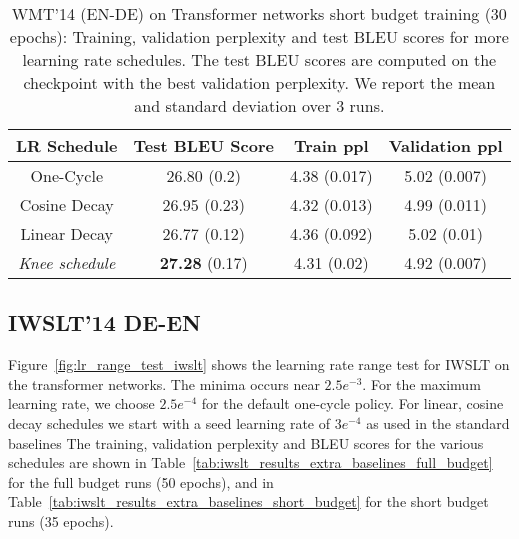 \documentclass[twoside,11pt]{article}
\newcommand{\lrschedule}{\textit{Knee schedule}}
\begin{document}
\begin{table}[!th]
\small
\centering
\caption{WMT'14 (EN-DE) on Transformer networks short budget training (30 epochs): Training, validation perplexity and test BLEU scores for more learning rate schedules. The test BLEU scores are computed on the checkpoint with the best validation perplexity. We report the mean and standard deviation over 3 runs.}
\label{tab:wmt_results_extra_baselines_short_budget}
\begin{tabular}{cccc}
  \toprule
  LR Schedule    & Test BLEU Score  & Train ppl & Validation ppl  \\ 
  \midrule
  One-Cycle      &  26.80 (0.2) & 4.38 (0.017)  & 5.02 (0.007)    \\
  Cosine Decay  &  26.95 (0.23) & 4.32 (0.013)  & 4.99 (0.011)   \\
  Linear Decay  & 26.77  (0.12) & 4.36 (0.092)  & 5.02 (0.01)  \\
  \lrschedule{} & \textbf{27.28} (0.17)  & 4.31 (0.02)   & 4.92 (0.007)    \\ 
  \bottomrule
\end{tabular}

\end{table}




\vspace{2in}
\subsection{IWSLT'14 DE-EN}
Figure~\ref{fig:lr_range_test_iwslt} shows the learning rate range test for IWSLT on the transformer networks. The minima occurs near $2.5e^{-3}$. For the maximum learning rate, we choose $2.5e^{-4}$ for the default one-cycle policy. For linear, cosine decay schedules we start with a seed learning rate of $3e^{-4}$ as used in the standard baselines The training, validation perplexity and BLEU scores for the various schedules are shown in Table~\ref{tab:iwslt_results_extra_baselines_full_budget} for the full budget runs (50 epochs), and in Table~\ref{tab:iwslt_results_extra_baselines_short_budget} for the short budget runs (35 epochs).
\end{document}
